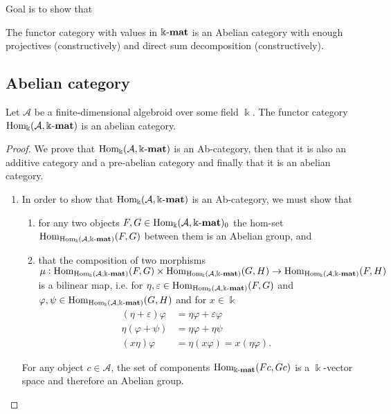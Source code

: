 Goal is to show that

The functor category with values in $\Bbbk\textnormal{-}\mathbf{mat}$ is an Abelian category with enough projectives (constructively) and direct sum decomposition (constructively).

\subsection{Abelian category}

\begin{theorem}\label{thm:functor_category_abelian}
Let $\mathcal{A}$ be a finite-dimensional algebroid over some field $\Bbbk$. The functor category $\mathrm{Hom_{\Bbbk}}(\mathcal{A},\Bbbk\textnormal{-}\mathbf{mat})$
is an abelian category.
\end{theorem}
\begin{proof}
We prove that $\mathrm{Hom_{\Bbbk}}(\mathcal{A},\Bbbk\textnormal{-}\mathbf{mat})$ is an Ab-category, then that it is also an additive category and a pre-abelian category and finally that
it is an abelian category.
\begin{enumerate}
\renewcommand{\labelenumi}{(\theenumi)}
\item In order to show that $\mathrm{Hom_{\Bbbk}}(\mathcal{A},\Bbbk\textnormal{-}\mathbf{mat})$ is an Ab-category, we must show that 
\begin{enumerate}
\renewcommand{\labelenumii}{(\roman{enumii})}
\item for any two objects $F,G \in \mathrm{Hom_{\Bbbk}}(\mathcal{A},\Bbbk\textnormal{-}\mathbf{mat})_{0}$ the hom-set $\mathrm{Hom}_{\mathrm{Hom_{\Bbbk}}(\mathcal{A},\Bbbk\textnormal{-}\mathbf{mat})}(F,G)$ between them is an Abelian group, and
\item that the composition of two morphisms\\
$\mu : \mathrm{Hom}_{\mathrm{Hom_{\Bbbk}}(\mathcal{A},\Bbbk\textnormal{-}\mathbf{mat})}(F,G) \times \mathrm{Hom}_{\mathrm{Hom_{\Bbbk}}(\mathcal{A},\Bbbk\textnormal{-}\mathbf{mat})}(G,H) \rightarrow \mathrm{Hom}_{\mathrm{Hom_{\Bbbk}}(\mathcal{A},\Bbbk\textnormal{-}\mathbf{mat})}(F,H)$ is a
bilinear map, i.e. for $\eta, \varepsilon \in \mathrm{Hom}_{\mathrm{Hom_{\Bbbk}}(\mathcal{A},\Bbbk\textnormal{-}\mathbf{mat})}(F,G)$ and $\varphi, \psi \in \mathrm{Hom}_{\mathrm{Hom_{\Bbbk}}(\mathcal{A},\Bbbk\textnormal{-}\mathbf{mat})}(G,H)$ and
for $x \in \Bbbk$
\begin{align}
(\eta + \varepsilon)\varphi &= \eta\varphi + \varepsilon\varphi \\
\eta(\varphi + \psi) &= \eta\varphi + \eta\psi \\
(x\eta)\varphi &= \eta(x\varphi) = x(\eta\varphi).
\end{align}
\end{enumerate}

\begin{subproof}[Proof of (i)]
For any object $c \in \mathcal{A}$, the set of components $\mathrm{Hom}_{\Bbbk\textnormal{-}\mathbf{mat}}(Fc,Gc)$ is a $\Bbbk$-vector space and therefore an
Abelian group.


\end{subproof}
\end{enumerate}
\end{proof}
